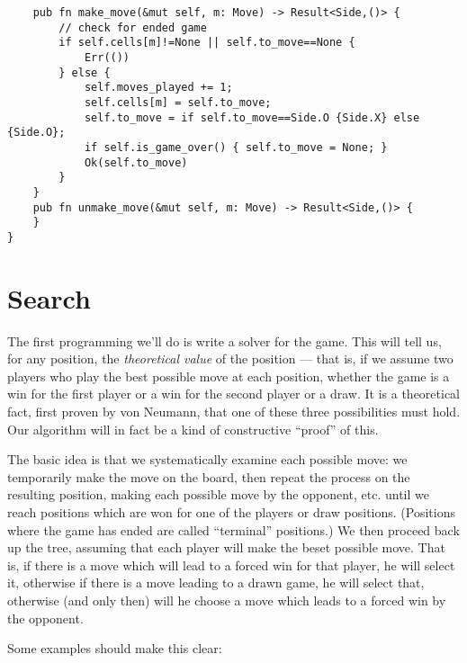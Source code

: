 \documentclass[10pt,dvipdfmx]{report}
\begin{document}
{\begin{verbatim}
    pub fn make_move(&mut self, m: Move) -> Result<Side,()> {
        // check for ended game
        if self.cells[m]!=None || self.to_move==None {
            Err(())
        } else {
            self.moves_played += 1;
            self.cells[m] = self.to_move;
            self.to_move = if self.to_move==Side.O {Side.X} else {Side.O};
            if self.is_game_over() { self.to_move = None; }
            Ok(self.to_move)
        }
    }
    pub fn unmake_move(&mut self, m: Move) -> Result<Side,()> {
    }
}
\end{verbatim}
}


\section{Search}
The first programming we'll do is write a solver for the game.
This will tell us, for any position, the {\em theoretical value}
of the position  --- that is, if we assume two players who play
the best possible move at each position, whether the game is a win
for the first player or a win for the second player or a draw.
It is a theoretical fact, first proven by von Neumann, that one of
these three possibilities must hold.  Our algorithm will in fact be
a kind of constructive ``proof'' of this.

The basic idea is that we systematically examine each possible move:
we temporarily make the move on the board, then repeat the process
on the resulting position, making each possible move by the opponent,
etc. until we reach positions which are won for one of the players
or draw positions.  (Positions where the game has ended are called
``terminal'' positions.)  We then proceed back up the tree, assuming
that each player will make the beset possible move.  That is, if there
is a move which will lead to a forced win for that player,
he will select it, otherwise if there is a move leading to a drawn game,
he will select that, otherwise (and only then) will he choose a move
which leads to a forced win by the opponent.

Some examples should make this clear:
\end{document}
